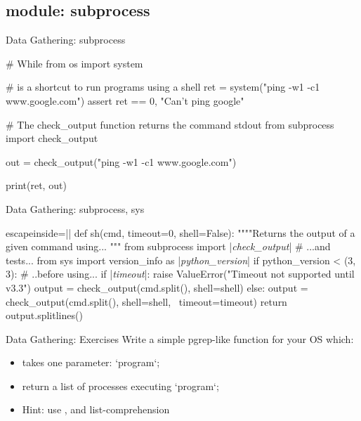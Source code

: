 \subsection{module: subprocess}
\begin{frame}[fragile]{Data Gathering: subprocess}
\begin{pythoncode}
# While 
from os import system

# is a shortcut to run programs using a shell
ret = system("ping -w1 -c1 www.google.com")
assert ret == 0, "Can't ping google"

# The check_output function returns the command stdout
from subprocess import check_output

out = check_output("ping -w1 -c1 www.google.com")

print(ret, out)
\end{pythoncode}
\end{frame}

\begin{frame}[fragile]{Data Gathering: subprocess, sys}
\begin{pythoncode*}{escapeinside=||}
def sh(cmd, timeout=0, shell=False):
  """"Returns the output of a given command using... """
  from subprocess import |\emph{check_output}| # ...and tests...
  from sys import version_info as |\emph{python_version}|
  if python_version < (3, 3): # ..before using...
    if |\emph{timeout}|:
      raise ValueError("Timeout not supported until v3.3")
    output = check_output(cmd.split(), shell=shell)
  else:
    output = check_output(cmd.split(), shell=shell, \
                          timeout=timeout)
  return output.splitlines()
    
\end{pythoncode*}
\end{frame}

\begin{frame}[fragile]{Data Gathering: Exercises}
Write a simple pgrep-like function for your OS which:
\begin{itemize}
\item takes one parameter: `program`;
\item return a list of processes executing `program`;
\item Hint: use , and list-comprehension
\end{itemize}
\end{frame}


